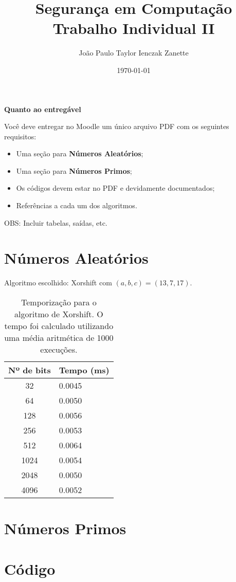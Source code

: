 \documentclass{article}
\title{%
    Segurança em Computação \\
    Trabalho Individual II
}
\author{João Paulo Taylor Ienczak Zanette}
\date{\today}
\begin{document}
    \maketitle{}

    \begin{superframe}
        \textbf{Quanto ao entregável}

        Você deve entregar no Moodle um único arquivo PDF com os seguintes requisitos:

        \begin{itemize}
            \item Uma seção para \textbf{Números Aleatórios};
            \item Uma seção para \textbf{Números Primos};
            \item Os códigos devem estar no PDF e devidamente documentados;
            \item Referências a cada um dos algoritmos.
        \end{itemize}

        OBS\@: Incluir tabelas, saídas, etc.
    \end{superframe}

    \section{Números Aleatórios}

    Algoritmo escolhido: Xorshift com $(a, b, c) = (13, 7, 17)$.

    \begin{table}[ht]
        \centering
        \begin{tabular}{c l}
            \toprule
            Nº de bits & Tempo (ms) \\
            \midrule
            32 & 0.0045 \\
            64 & 0.0050 \\
            128 & 0.0056 \\
            256 & 0.0053 \\
            512 & 0.0064 \\
            1024 & 0.0054 \\
            2048 & 0.0050 \\
            4096 & 0.0052 \\
            \bottomrule
        \end{tabular}
        \caption{%
            Temporização para o algoritmo de Xorshift. O tempo foi calculado
            utilizando uma média aritmética de 1000 execuções.
        }
    \end{table}

    \section{Números Primos}

    \section{Código}

    \inputminted[lastline=91]{python}{../rng.py}

    
\end{document}

